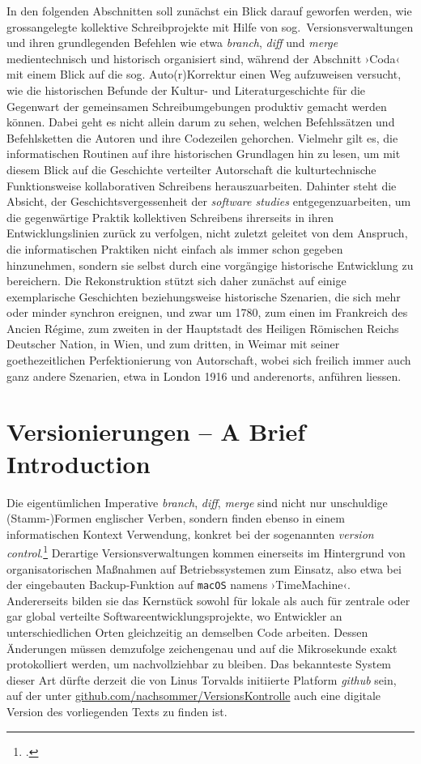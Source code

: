 \documentclass[a4paper,10pt]{article}
\newcommand{\inanf}[1]{›#1‹}
\begin{document}
In den folgenden Abschnitten soll zunächst ein Blick darauf geworfen werden, wie grossangelegte kollektive Schreibprojekte mit Hilfe von sog.\ Versionsverwaltungen und ihren grundlegenden Befehlen wie etwa \emph{branch}, \emph{diff} und \emph{merge} medientechnisch und historisch organisiert sind, während der Abschnitt \inanf{Coda} mit einem Blick auf die sog. Auto(r)Korrektur einen Weg aufzuweisen versucht, wie die historischen Befunde der Kultur- und Literaturgeschichte für die Gegenwart der gemeinsamen Schreibumgebungen produktiv gemacht werden können. Dabei geht es nicht allein darum zu sehen, welchen Befehlssätzen und Befehlsketten die Autoren und ihre Codezeilen gehorchen. Vielmehr gilt es, die informatischen Routinen auf ihre historischen Grundlagen hin zu lesen, um mit diesem Blick auf die Geschichte verteilter Autorschaft die kulturtechnische Funktionsweise kollaborativen Schreibens herauszuarbeiten. Dahinter steht die Absicht, der Geschichtsvergessenheit der \emph{software studies} entgegenzuarbeiten, um die gegenwärtige Praktik kollektiven Schreibens ihrerseits in ihren Entwicklungslinien zurück zu verfolgen, nicht zuletzt geleitet von dem Anspruch, die informatischen Praktiken nicht einfach als immer schon gegeben hinzunehmen, sondern sie selbst durch eine vorgängige historische Entwicklung zu bereichern. Die Rekonstruktion stützt sich daher zunächst auf einige exemplarische Geschichten beziehungsweise historische Szenarien, die sich mehr oder minder synchron ereignen, und zwar um 1780, zum einen im Frankreich des Ancien Régime, zum zweiten in der Hauptstadt des Heiligen Römischen Reichs Deutscher Nation, in Wien, und zum dritten, in Weimar mit seiner goethezeitlichen Perfektionierung von Autorschaft, wobei sich freilich immer auch ganz andere Szenarien, etwa in London 1916 und anderenorts, anführen liessen.

\section{Versionierungen – A Brief Introduction}

Die eigentümlichen Imperative \emph{branch}, \emph{diff}, \emph{merge} sind nicht nur unschuldige (Stamm-)Formen englischer Verben, sondern finden ebenso in einem informatischen Kontext Verwendung, konkret bei der sogenannten \emph{version control}.\footcite[Vgl.][]{yuill:2008} Derartige Versionsverwaltungen kommen einerseits im Hintergrund von organisatorischen Maßnahmen auf Betriebssystemen zum Einsatz, also etwa bei der eingebauten Backup-Funktion auf \verb+macOS+ namens \inanf{TimeMachine}. Andererseits bilden sie das Kernstück sowohl für lokale als auch für zentrale oder gar global verteilte Softwareentwicklungsprojekte, wo Entwickler an unterschiedlichen Orten gleichzeitig an demselben Code arbeiten. Dessen Änderungen müssen demzufolge zeichengenau und auf die Mikrosekunde exakt protokolliert werden, um nachvollziehbar zu bleiben. Das bekannteste System dieser Art dürfte derzeit die von Linus Torvalds initiierte Platform \emph{github} sein, auf der unter \href{https://github.com/nachsommer/VersionsKontrolle}{github.com/nachsommer/VersionsKontrolle} auch eine digitale Version des vorliegenden Texts zu finden ist. 
\end{document}
